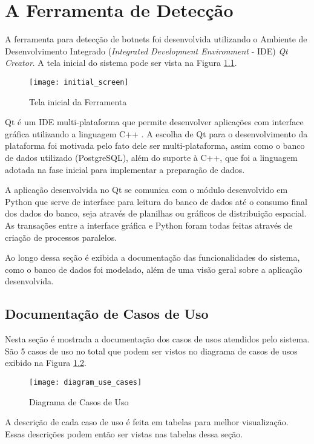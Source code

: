\chapter{A Ferramenta de Detecção}
A ferramenta para detecção de botnets foi desenvolvida utilizando o Ambiente de Desenvolvimento Integrado (\textit{Integrated Development Environment} - IDE) \textit{Qt Creator}. A tela inicial do sistema pode ser vista na Figura \ref{fig:initial_screen}.

\begin{figure}
\centering
\texttt{[image: initial\_screen]}
\caption[Tela inicial da Ferramenta]{Tela inicial da Ferramenta} \label{fig:initial_screen}
\end{figure}

Qt é um IDE multi-plataforma que permite desenvolver aplicações com interface gráfica utilizando a linguagem C++ \citep{qtsite}. A escolha de Qt para o desenvolvimento da plataforma foi motivada pelo fato dele ser multi-plataforma, assim como o banco de dados utilizado (PostgreSQL), além do suporte à C++, que foi a linguagem adotada na fase inicial para implementar a preparação de dados.

A aplicação desenvolvida no Qt se comunica com o módulo desenvolvido em Python que serve de interface para leitura do banco de dados até o consumo final dos dados do banco, seja através de planilhas ou gráficos de distribuição espacial. As transações entre a interface gráfica e Python foram todas feitas através de criação de processos paralelos.

Ao longo dessa seção é exibida a documentação das funcionalidades do sistema, como o banco de dados foi modelado, além de uma visão geral sobre a aplicação desenvolvida.

\section{Documentação de Casos de Uso}
Nesta seção é mostrada a documentação dos casos de usos atendidos pelo sistema. São 5 casos de uso no total que podem ser vistos no diagrama de casos de usos exibido na Figura \ref{fig:diagram_use_cases}. 

\begin{figure}
\centering
\texttt{[image: diagram\_use\_cases]}
\caption[Diagrama de Casos de Uso]{Diagrama de Casos de Uso} \label{fig:diagram_use_cases}
\end{figure}

A descrição de cada caso de uso é feita em tabelas para melhor visualização. Essas descrições podem então ser vistas nas tabelas dessa seção. 

